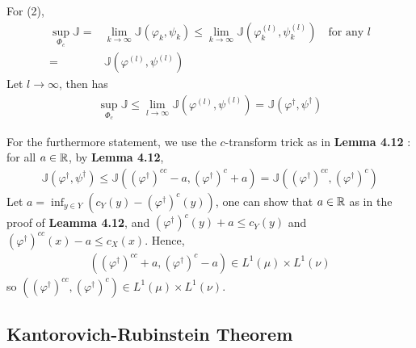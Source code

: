 \documentclass[12pt,a4paper]{article}
\newenvironment{proof}
{\begin{changemargin}{1cm}{0.5cm} 
	}%
	{\end{changemargin}
}
\newenvironment{p}
{\begin{proof} 
	}%
	{\end{proof}
}
\begin{document}
\begin{p}
\quad For (2),
\begin{align*}
\sup_{\Phi_c} \mathbb{J} =& \lim_{k\rightarrow \infty} \mathbb{J}(\varphi_k, \psi_k) \leq \lim_{k\rightarrow \infty} \mathbb{J}(\varphi_k^{(l)}, \psi_k^{(l)}) \quad \text{for any } l\\
=& \mathbb{J} (\varphi^{(l)}, \psi^{(l)})
\end{align*}
Let $l\rightarrow \infty$, then has
\begin{align*}
\sup_{\Phi_c} \mathbb{J} \leq \lim_{l\rightarrow \infty} \mathbb{J}(\varphi^{(l)}, \psi^{(l)}) = \mathbb{J}(\varphi^{\dagger}, \psi^{\dagger})
\end{align*}
\s

For the furthermore statement, we use the $c$-transform trick as in \textbf{Lemma 4.12} : for all $a\in \mathbb{R}$, by \textbf{Lemma 4.12},
\begin{align*}
\mathbb{J}(\varphi^{\dagger}, \psi^{\dagger}) \leq \mathbb{J}((\varphi^{\dagger})^{cc} - a, (\varphi^{\dagger})^c +a) = \mathbb{J}((\varphi^{\dagger})^{cc}, (\varphi^{\dagger})^c)
\end{align*}
Let $a= \inf_{y\in Y} (c_Y(y) - (\varphi^{\dagger})^c (y))$, one can show that $a\in \mathbb{R}$ as in the proof of \textbf{Leamma 4.12}, and $(\varphi^{\dagger})^c(y) + a\leq c_Y(y)$ and $(\varphi^{\dagger})^{cc} (x) - a \leq c_X(x)$. Hence,
\begin{align*}
((\varphi^{\dagger})^{cc} +a, (\varphi^{\dagger})^c -a) \in L^1(\mu) \times L^1(\nu)
\end{align*}
so $((\varphi^{\dagger})^{cc}, (\varphi^{\dagger})^c) \in L^1(\mu) \times L^1(\nu)$.

\eop
\end{p}
\s

\subsection{Kantorovich-Rubinstein Theorem}
\end{document}
